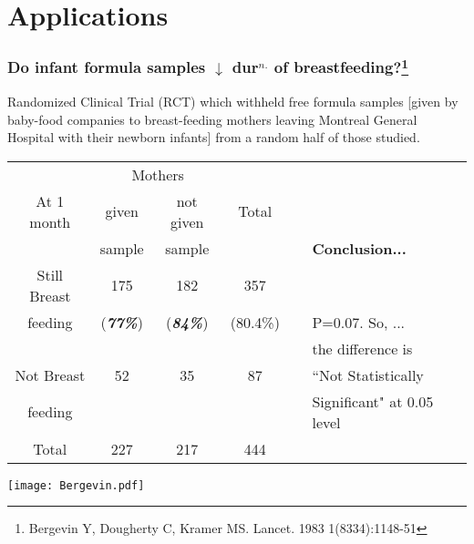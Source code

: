 \documentclass[10pt,handout]{beamer}\usepackage[]{graphicx}\usepackage[]{color}
\begin{document}
\section{Applications}


\begin{frame}
	\frametitle{Do infant formula samples $\downarrow$ dur$^{n.}$ of breastfeeding?\footnote{{\footnotesize Bergevin Y, Dougherty C, Kramer MS. Lancet. 1983 1(8334):1148-51}}}
	
	
	
	Randomized Clinical Trial (RCT) which withheld free formula samples [given by baby-food companies to breast-feeding mothers leaving Montreal General Hospital with their newborn infants] from a random half of those studied.
	
	\begin{scriptsize}
		\begin{center}
			\begin{tabular}{|c c c c c| l|}
				\hline
				& \multicolumn{2}{c}{Mothers}  & & & \\
				At 1 month & given & not given & Total  & $ \ $ &  \\
				& sample & sample & & & \textbf{Conclusion...} \\ 
				\hline
				Still Breast & 175 & 182 & 357 & & \\ 
				feeding & (\textbf{\textit{77\%}}) & (\textbf{\textit{84\%}}) & (80.4\%) & 
				& P=0.07. So, ...  \\ 
				& & & & & the difference is   \\
				Not Breast & 52 & 35 & 87  &  &  ``Not Statistically \\ 
				feeding &  & & & &  Significant" at 0.05 level  \\
				\hline
				Total & 227 & 217 &  444 & & \\
				\hline
			\end{tabular}
		\end{center}
	\end{scriptsize}
	
	\begin{center}
		\texttt{[image: Bergevin.pdf]}
	\end{center}
	
\end{frame}
\end{document}
